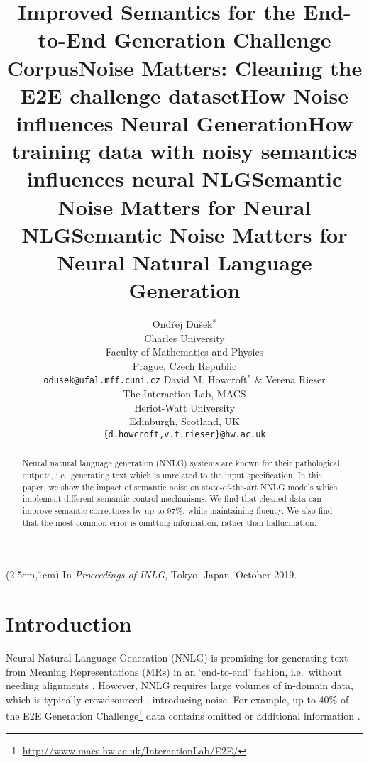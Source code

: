 \documentclass[11pt,a4paper]{article}
\title{Improved Semantics for the End-to-End Generation Challenge Corpus}
\title{Noise Matters: Cleaning the E2E challenge dataset}
\title{How \OD{Training Data} Noise influences Neural Generation}
\title{How training data with noisy semantics influences neural NLG}
\title{Semantic Noise Matters for Neural NLG}
\title{Semantic Noise Matters for Neural Natural Language Generation}
\author{Ondřej Dušek$^\ast$\\ Charles University\\ 
Faculty of Mathematics and Physics \\
Prague, Czech Republic\\
\hspace{-2em}\texttt{odusek@ufal.mff.cuni.cz}
\And 
David M. Howcroft$^\ast$ {\rm \&} Verena Rieser\\
The Interaction Lab, MACS\\
Heriot-Watt University \\
Edinburgh, Scotland, UK\\
\texttt{\{d.howcroft,v.t.rieser\}@hw.ac.uk}}
\date{}
\begin{document}
\maketitle

\begin{textblock*}{\textwidth}(2.5cm,1cm)
In \emph{Proceedings of INLG}, Tokyo, Japan, October 2019.
\end{textblock*}

\begin{abstract}

\setcounter{footnote}{1}
\renewcommand{\thefootnote}{\fnsymbol{footnote}}
\setcounter{footnote}{0}

Neural natural language generation (NNLG) systems are known for their pathological outputs, i.e.\ generating text which is unrelated to the input specification. In this paper, we show the impact of semantic noise on state-of-the-art NNLG models which implement different semantic control mechanisms.
We find that cleaned data can improve semantic correctness by up to 97\%, while maintaining fluency. 
We also find that the most common error is omitting information, rather than hallucination.
 
\end{abstract}


\section{Introduction}
\label{sec:introduction}

Neural Natural Language Generation (NNLG) is promising for generating text from Meaning Representations (MRs) in an  `end-to-end' fashion, i.e.\ without needing alignments \cite{wen:emnlp2015, Wen:NAACL16, Dusek:ACL16, Mei:NAACL2016}. 
However, NNLG requires large volumes of in-domain data, which is typically crowdsourced \citep[e.g.][]{mairesse:acl2010,novikova:INLG2016,wen:emnlp2015,Wen:NAACL16,howcroft.etal2017:interspeech}, introducing noise. 
For example, up to 40\% of the E2E Generation Challenge\footnote{\url{http://www.macs.hw.ac.uk/InteractionLab/E2E/}} data contains omitted or additional information \cite{dusek_evaluating_2019}. 
\end{document}
